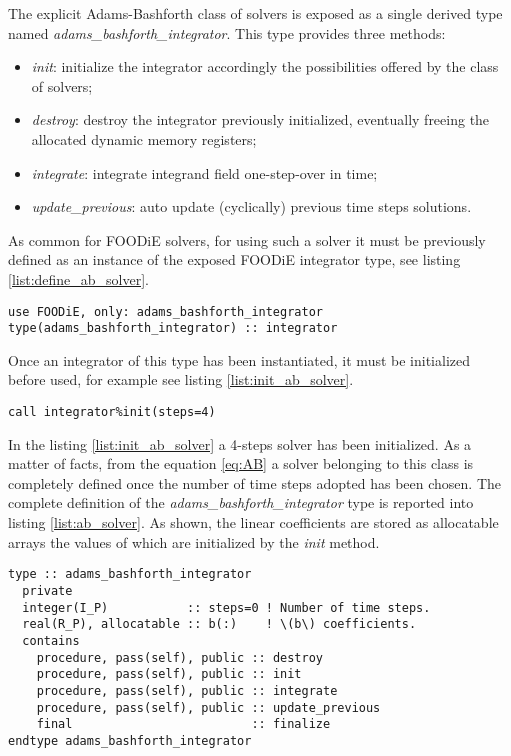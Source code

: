 \documentclass[pdftex,preprint,3p,times,numbers]{elsarticle}
\begin{document}
The explicit Adams-Bashforth class of solvers is exposed as a single derived type named \emph{adams\_bashforth\_integrator}. This type provides three methods:

\begin{itemize}
  \item \emph{init}: initialize the integrator accordingly the possibilities offered by the class of solvers;
  \item \emph{destroy}: destroy the integrator previously initialized, eventually freeing the allocated dynamic memory registers;
  \item \emph{integrate}: integrate integrand field one-step-over in time;
  \item \emph{update\_previous}: auto update (cyclically) previous time steps solutions.
  \end{itemize}

As common for FOODiE solvers, for using such a solver it must be previously defined as an instance of the exposed FOODiE integrator type, see listing \ref{list:define_ab_solver}.

\begin{lstlisting}[firstnumber=1,style=code,caption={definition of an explicit Adams-Bashforth integrator},label={list:define_ab_solver}]
use FOODiE, only: adams_bashforth_integrator
type(adams_bashforth_integrator) :: integrator
\end{lstlisting}

Once an integrator of this type has been instantiated, it must be initialized before used, for example see listing \ref{list:init_ab_solver}.

\begin{lstlisting}[firstnumber=1,style=code,caption={example of initialization of an explicit Adams-Bashforth integrator},label={list:init_ab_solver}]
call integrator%init(steps=4)
\end{lstlisting}

In the listing \ref{list:init_ab_solver} a 4-steps solver has been initialized. As a matter of facts, from the equation \ref{eq:AB} a solver belonging to this class is completely defined once the number of time steps adopted has been chosen. The complete definition of the \emph{adams\_bashforth\_integrator} type is reported into listing \ref{list:ab_solver}. As shown, the linear coefficients are stored as allocatable arrays the values of which are initialized by the \emph{init} method.

\begin{lstlisting}[firstnumber=1,style=code,caption={definition of \emph{adams\_bashforth\_integrator} type},label={list:ab_solver}]
type :: adams_bashforth_integrator
  private
  integer(I_P)           :: steps=0 ! Number of time steps.
  real(R_P), allocatable :: b(:)    ! \(b\) coefficients.
  contains
    procedure, pass(self), public :: destroy
    procedure, pass(self), public :: init
    procedure, pass(self), public :: integrate
    procedure, pass(self), public :: update_previous
    final                         :: finalize
endtype adams_bashforth_integrator
\end{lstlisting}
\end{document}
